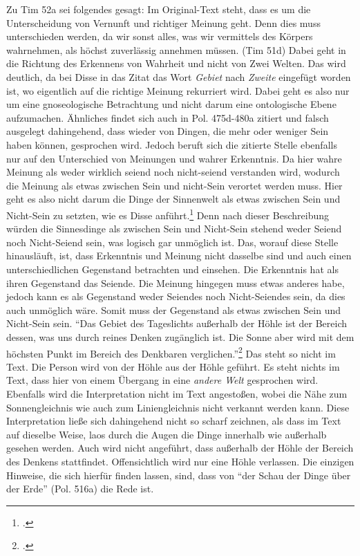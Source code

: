 Zu Tim 52a sei folgendes gesagt: Im Original-Text steht, dass es um die Unterscheidung von Vernunft und richtiger Meinung geht. Denn dies muss unterschieden werden, da wir sonst alles, was wir vermittels des Körpers wahrnehmen, als höchst zuverlässig annehmen müssen. (Tim 51d) Dabei geht in die Richtung des Erkennens von Wahrheit und nicht von Zwei Welten. Das wird deutlich, da bei Disse in das Zitat das Wort \emph{Gebiet} nach \emph{Zweite} eingefügt worden ist, wo eigentlich auf die richtige Meinung rekurriert wird. Dabei geht es also nur um eine gnoseologische Betrachtung und nicht darum eine ontologische Ebene aufzumachen.
Ähnliches findet sich auch in Pol. 475d-480a zitiert und falsch ausgelegt dahingehend, dass wieder von Dingen, die mehr oder weniger Sein haben können, gesprochen wird. Jedoch beruft sich die zitierte Stelle ebenfalls nur auf den Unterschied von Meinungen und wahrer Erkenntnis. Da hier wahre Meinung als weder wirklich seiend noch nicht-seiend verstanden wird, wodurch die Meinung als etwas zwischen Sein und nicht-Sein verortet werden muss. Hier geht es also nicht darum die Dinge der Sinnenwelt als etwas zwischen Sein und Nicht-Sein zu setzten, wie es Disse anführt.\footcite[vgl.][S. 38]{DisseMetaphysik} 
Denn nach dieser Beschreibung würden die Sinnesdinge als zwischen Sein und Nicht-Sein stehend weder Seiend noch Nicht-Seiend sein, was logisch gar unmöglich ist.   
Das, worauf diese Stelle hinausläuft, ist, dass Erkenntnis und Meinung nicht dasselbe sind und auch einen unterschiedlichen Gegenstand betrachten und einsehen. Die Erkenntnis hat als ihren Gegenstand das Seiende. Die Meinung hingegen muss etwas anderes habe, jedoch kann es als Gegenstand weder Seiendes noch Nicht-Seiendes sein, da dies auch unmöglich wäre. Somit muss der Gegenstand als etwas zwischen Sein und Nicht-Sein sein. 
\enquote{Das Gebiet des Tageslichts außerhalb der Höhle ist der Bereich dessen, was uns durch reines Denken zugänglich ist. Die Sonne aber wird mit dem höchsten Punkt im Bereich des Denkbaren verglichen.}\footcite[][S. 49]{DisseMetaphysik} Das steht so nicht im Text. Die Person wird von der Höhle aus der Höhle geführt. Es steht nichts im Text, dass hier von einem Übergang in eine \emph{andere Welt} gesprochen wird. Ebenfalls wird die Interpretation nicht im Text angestoßen, wobei die Nähe zum Sonnengleichnis wie auch zum Liniengleichnis nicht verkannt werden kann. Diese Interpretation ließe sich dahingehend nicht so scharf zeichnen, als dass im Text auf dieselbe Weise, laos durch die Augen die Dinge innerhalb wie außerhalb gesehen werden. Auch wird nicht angeführt, dass außerhalb der Höhle der Bereich des Denkens stattfindet. Offensichtlich wird nur eine Höhle verlassen. Die einzigen Hinweise, die sich hierfür finden lassen, sind, dass von \enquote{der Schau der Dinge über der Erde} (Pol. 516a) die Rede ist. 
